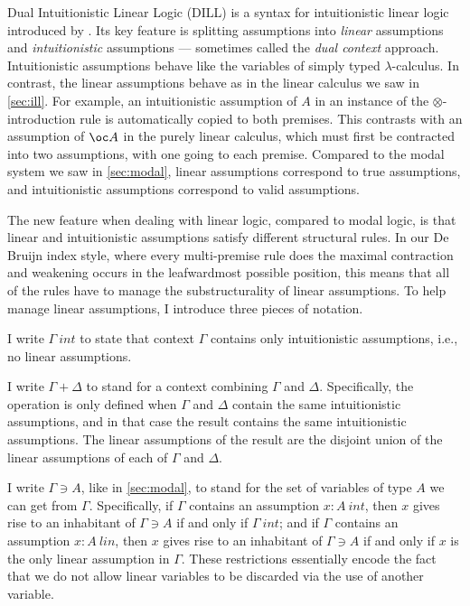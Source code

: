 Dual Intuitionistic Linear Logic (DILL) is a syntax for intuitionistic linear
logic introduced by \citet{Barber1996}.
Its key feature is splitting assumptions into \emph{linear} assumptions and
\emph{intuitionistic} assumptions --- sometimes called the \emph{dual context}
approach.
Intuitionistic assumptions behave like the variables of simply typed
$\lambda$-calculus.
In contrast, the linear assumptions behave as in the linear calculus we saw in
\cref{sec:ill}.
For example, an intuitionistic assumption of $A$ in an instance of the
$\otimes$-introduction rule is automatically copied to both premises.
This contrasts with an assumption of $\oc A$ in the purely linear calculus,
which must first
be contracted into two assumptions, with one going to each premise.
Compared to the modal system we saw in \cref{sec:modal}, linear assumptions
correspond to true assumptions, and intuitionistic assumptions correspond to
valid assumptions.

The new feature when dealing with linear logic, compared to modal logic, is that
linear and intuitionistic assumptions satisfy different structural rules.
In our De Bruijn index style, where every multi-premise rule does the maximal
contraction and weakening occurs in the leafwardmost possible position,
this means that all of the rules have to manage the substructurality of linear
assumptions.
To help manage linear assumptions, I introduce three pieces of notation.

\begin{definition}\label{def:DILL-empty}
  I write $\Gamma~\mathit{int}$ to state that context $\Gamma$ contains only
  intuitionistic assumptions, i.e., no linear assumptions.
\end{definition}

\begin{definition}\label{def:DILL-split}
  I write $\Gamma + \Delta$ to stand for a context combining $\Gamma$ and
  $\Delta$.
  Specifically, the operation is only defined when $\Gamma$ and $\Delta$ contain
  the same intuitionistic assumptions, and in that case the result contains the
  same intuitionistic assumptions.
  The linear assumptions of the result are the disjoint union of the linear
  assumptions of each of $\Gamma$ and $\Delta$.
\end{definition}

\begin{definition}\label{def:DILL-var}
  I write $\Gamma \ni A$, like in \cref{sec:modal}, to stand for the set of
  variables of type $A$ we can get from $\Gamma$.
  Specifically, if $\Gamma$ contains an assumption $x : A~\mathit{int}$, then
  $x$ gives rise to an inhabitant of $\Gamma \ni A$ if and only if
  $\Gamma~\mathit{int}$; and if $\Gamma$ contains an assumption
  $x : A~\mathit{lin}$, then $x$ gives rise to an inhabitant of $\Gamma \ni A$
  if and only if $x$ is the only linear assumption in $\Gamma$.
  These restrictions essentially encode the fact that we do not allow linear
  variables to be discarded via the use of another variable.
\end{definition}

